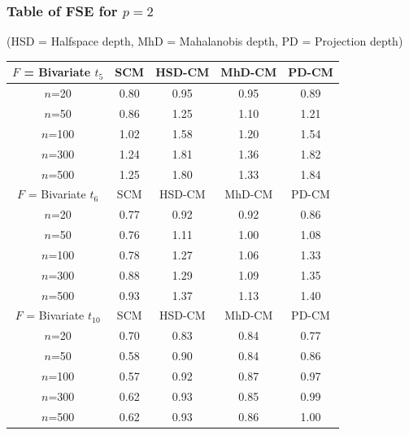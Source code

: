 \documentclass[handout,10pt]{beamer}
\begin{document}
\begin{frame}
\frametitle{Table of FSE for $p=2$}

(HSD = Halfspace depth, MhD = Mahalanobis depth, PD = Projection depth)
\begin{table}
\begin{footnotesize}
   \begin{tabular}{c|cccc}
    \hline
    $F$ = Bivariate $t_5$      & SCM  & HSD-CM & MhD-CM & PD-CM \\ \hline
    $n$=20                        & 0.80 & 0.95   & 0.95   & 0.89  \\
    $n$=50                        & 0.86 & 1.25   & 1.10   & 1.21  \\
    $n$=100                       & 1.02 & 1.58   & 1.20   & 1.54  \\
    $n$=300                       & 1.24 & 1.81   & 1.36   & 1.82  \\
    $n$=500                       & 1.25 & 1.80   & 1.33   & 1.84  \\ \hline
    $F$ = Bivariate $t_6$      & SCM  & HSD-CM & MhD-CM & PD-CM \\ \hline
    $n$=20                        & 0.77 & 0.92   & 0.92   & 0.86  \\
    $n$=50                        & 0.76 & 1.11   & 1.00   & 1.08  \\
    $n$=100                       & 0.78 & 1.27   & 1.06   & 1.33  \\
    $n$=300                       & 0.88 & 1.29   & 1.09   & 1.35  \\
    $n$=500                       & 0.93 & 1.37   & 1.13   & 1.40  \\ \hline
    $F$ = Bivariate $t_{10}$ & SCM  & HSD-CM & MhD-CM & PD-CM \\ \hline
    $n$=20                        & 0.70 & 0.83   & 0.84   & 0.77  \\
    $n$=50                        & 0.58 & 0.90   & 0.84   & 0.86  \\
    $n$=100                       & 0.57 & 0.92   & 0.87   & 0.97  \\
    $n$=300                       & 0.62 & 0.93   & 0.85   & 0.99  \\
    $n$=500                       & 0.62 & 0.93   & 0.86   & 1.00  \\ \hline
    \end{tabular}
\end{footnotesize}
\label{table:FSEtable1}
\end{table}
\end{frame}
\end{document}
